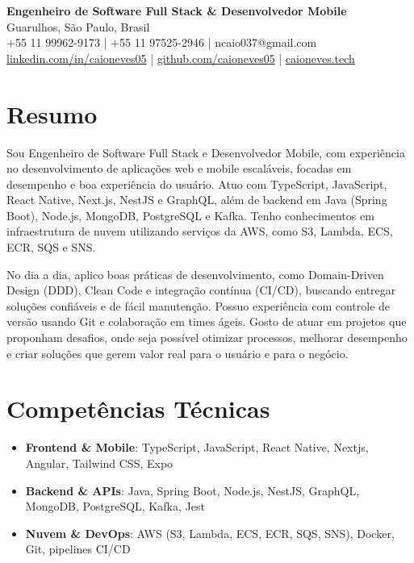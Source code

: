 \documentclass[11pt,letterpaper]{article}
\begin{document}
\begin{center}
    \textbf{\Large Engenheiro de Software Full Stack \& Desenvolvedor Mobile} \\
    \vspace{5pt}
    Guarulhos, São Paulo, Brasil \\
    +55 11 99962-9173 | +55 11 97525-2946 | ncaio037@gmail.com \\
    \href{https://www.linkedin.com/in/caioneves05}{linkedin.com/in/caioneves05} |
    \href{https://github.com/caioneves05}{github.com/caioneves05} |
    \href{http://caioneves.tech}{caioneves.tech}
\end{center}

\section{Resumo}
Sou Engenheiro de Software Full Stack e Desenvolvedor Mobile, com experiência no desenvolvimento de aplicações web e mobile escaláveis, focadas em desempenho e boa experiência do usuário. Atuo com TypeScript, JavaScript, React Native, Next.js, NestJS e GraphQL, além de backend em Java (Spring Boot), Node.js, MongoDB, PostgreSQL e Kafka. Tenho conhecimentos em infraestrutura de nuvem utilizando serviços da AWS, como S3, Lambda, ECS, ECR, SQS e SNS.

No dia a dia, aplico boas práticas de desenvolvimento, como Domain-Driven Design (DDD), Clean Code e integração contínua (CI/CD), buscando entregar soluções confiáveis e de fácil manutenção. Possuo experiência com controle de versão usando Git e colaboração em times ágeis. Gosto de atuar em projetos que proponham desafios, onde seja possível otimizar processos, melhorar desempenho e criar soluções que gerem valor real para o usuário e para o negócio.

\section{Competências Técnicas}
\begin{itemize}[leftmargin=*]
    \item \textbf{Frontend \& Mobile}: TypeScript, JavaScript, React Native, Nextjs, Angular, Tailwind CSS, Expo
    \item \textbf{Backend \& APIs}: Java, Spring Boot, Node.js, NestJS, GraphQL, MongoDB, PostgreSQL, Kafka, Jest
    \item \textbf{Nuvem \& DevOps}: AWS (S3, Lambda, ECS, ECR, SQS, SNS), Docker, Git, pipelines CI/CD
\end{itemize}
\end{document}
